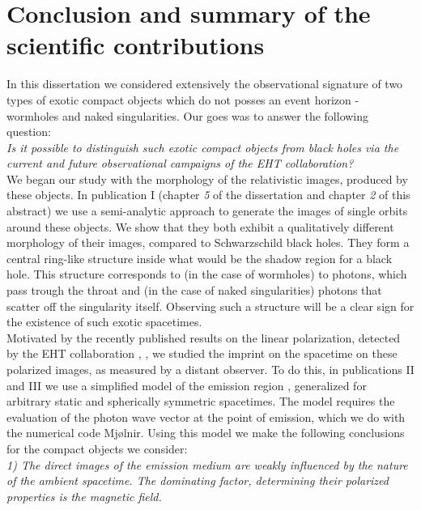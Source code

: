 \documentclass[12pt]{article}
\numberwithin{equation}{section}
\numberwithin{figure}{section}
\begin{document}
	\section{Conclusion and summary of the scientific contributions}
	
	In this dissertation we considered extensively the observational signature of two types of exotic compact objects which do not posses an event horizon - wormholes and naked singularities. Our goes was to answer the following question:\\
	
	\emph{Is it possible to distinguish such exotic compact objects from black holes via the current and future observational campaigns of the EHT collaboration?}\\
	
	We began our study with the morphology of the relativistic images, produced by these objects. In publication I (chapter \emph{5} of the dissertation and chapter \emph{2} of this abstract) we use a semi-analytic approach to generate the images of single orbits around these objects. We show that they both exhibit a qualitatively different morphology of their images, compared to Schwarzschild black holes. They form a central ring-like structure inside what would be the shadow region for a black hole. This structure corresponds to (in the case of wormholes) to photons, which pass trough the throat and (in the case of naked singularities) photons that scatter off the singularity itself. Observing such a structure will be a clear sign for the existence of such exotic spacetimes.\\
	
	Motivated by the recently published results on the linear polarization, detected by the EHT collaboration \cite{EHT_M87_VII}, \cite{EHT_M87_VIII}, we studied the imprint on the spacetime on these polarized images, as measured by a distant observer. To do this, in publications II and III we use a simplified model of the emission region \cite{Narayan2021}, generalized for arbitrary static and spherically symmetric spacetimes. The model requires the evaluation of the photon wave vector at the point of emission, which we do with the numerical code Mjølnir. Using this model we make the following conclusions for the compact objects we consider:\\
	
	\emph{1) The direct images of the emission medium are weakly influenced by the nature of the ambient spacetime. The dominating factor, determining their polarized properties is the magnetic field.}\\
	
\end{document}
